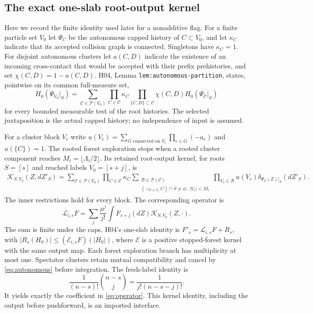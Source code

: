 \documentclass[11pt]{article}
\newcommand{\calP}{\mathcal P}
\theoremstyle{definition}\newtheorem{definition}[theorem]{Definition}
\theoremstyle{remark}\newtheorem{remark}[theorem]{Remark}
\numberwithin{equation}{section}
\begin{document}
\subsection{The exact one-slab root-output kernel}\label{subsec:kernels}
Here we record the finite identity used later for a nonadditive flag. For a
finite particle set $V_0$ let $\Psi_C$ be the autonomous capped history of
$C\subset V_0$, and let $\kappa_C$ indicate that its accepted collision graph
is connected. Singletons have $\kappa_C=1$. For disjoint autonomous clusters
let $a(C,D)$ indicate the existence of an incoming cross-contact that would
be accepted with their prefix prehistories, and set $\chi(C,D)=1-a(C,D)$.
H04, Lemma \texttt{lem:autonomous-partition}, states, pointwise on its common
full-measure set,
\begin{equation}\label{eq:autonomous}
 H_0(\Psi_{V_0}|_S)=\sum_{\mathcal C\in\calP(V_0)}
    \prod_{C\in\mathcal C}\kappa_C
    \prod_{\{C,D\}\subset\mathcal C}\chi(C,D)
                      H_0(\Psi_{\mathcal C}|_S)
\end{equation}
for every bounded measurable test of the root histories. The selected
juxtaposition is the actual capped history; no independence of input is
assumed.

For a cluster block $V_c$ write
$u(V_c)=\sum_{G\text{ connected on }V_c}\prod_{e\in G}(-a_e)$ and
$u(\{C\})=1$. The rooted forest exploration stops when a rooted cluster
component reaches $M_i=\lfloor\Lambda_i/2\rfloor$. Its retained root-output
kernel, for roots $S=[s]$ and reached labels $V_0=[s+j]$, is
\begin{align}
 \mathcal K_{S,V_0}(Z,dZ'_S)
 =\sum_{\mathcal C\in\calP(V_0)}\prod_{C\in\mathcal C}\kappa_C
 \sum_{\substack{\mathcal B\in\calP(\mathcal C)\\
       (\cup_{C\in V_c}C)\cap S\ne\varnothing,\ |V_c|<M_i}}
 \prod_{V_c\in\mathcal B}u(V_c)
                   \delta_{\Psi_{\mathcal C}(Z)|_S}(dZ'_S).
       \label{eq:kernel}
\end{align}
The inner restrictions hold for every block. The corresponding operator is
\begin{equation}\label{eq:operator}
 \mathcal L_{i,s}F=\sum_j\frac{\mu^j}{j!}
                        \int F_{s+j}(dZ)\mathcal K_{S,V_0}(Z,\cdot).
\end{equation}
The sum is finite under the caps. H04's one-slab identity is
$F'_{s}=\mathcal L_{i,s}F+R_s$, with
$|R_s(H_0)|\le(\mathcal E_{i,s}F)(|H_0|)$, where $\mathcal E$ is a positive
stopped-forest kernel with the same output map. Each forest exploration
branch has multiplicity at most one. Spectator clusters retain mutual
compatibility and cancel by \eqref{eq:autonomous} before integration. The
fresh-label identity is
\begin{equation}\label{eq:fresh}
 \frac1{(n-s)!}\binom{n-s}{j}=\frac1{j!(n-s-j)!}.
\end{equation}
It yields exactly the coefficient in \eqref{eq:operator}. This kernel
identity, including the output before pushforward, is an imported interface.
\end{document}
